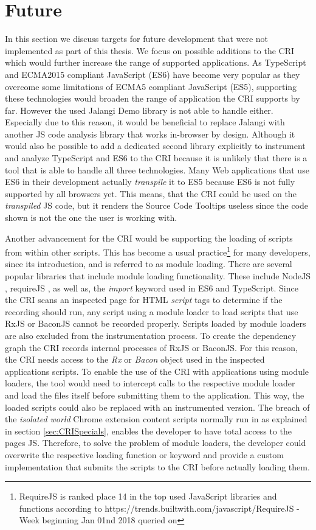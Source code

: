 \section{Future}
In this section we discuss targets for future development that were not implemented as part of this thesis. We focus on possible additions to the CRI which would further increase the range of supported applications. As TypeScript and ECMA2015 compliant JavaScript (ES6) have become very popular as they overcome some limitations of ECMA5 compliant JavaScript (ES5), supporting these technologies would broaden the range of application the CRI supports by far. However the used Jalangi Demo library is not able to handle either. Especially due to this reason, it would be beneficial to replace Jalangi with another JS code analysis library that works in-browser by design. Although it would also be possible to add a dedicated second library explicitly to instrument and analyze TypeScript and ES6 to the CRI because it is unlikely that there is a tool that is able to handle all three technologies. Many Web applications that use ES6 in their development actually \emph{transpile} it to ES5 because ES6 is not fully supported by all browsers yet. This means, that the CRI could be used on the \emph{transpiled} JS code, but it renders the Source Code Tooltips useless since the code shown is not the one the user is working with.

Another advancement for the CRI would be supporting the loading of scripts from within other scripts. This has become a usual practice\footnote{RequireJS is ranked place 14 in the top used JavaScript libraries and functions according to https://trends.builtwith.com/javascript/RequireJS - Week beginning Jan 01nd 2018 queried on \date{2018-01-03}} for many developers, since its introduction, and is referred to as module loading. There are several popular libraries that include module loading functionality. These include NodeJS \cite{NodeJS}, requireJS \cite{RequireJS}, as well as, the \emph{import} keyword used in ES6 and TypeScript. Since the CRI scans an inspected page for HTML \emph{script} tags to determine if the recording should run, any script using a module loader to load scripts that use RxJS or BaconJS cannot be recorded properly. Scripts loaded by module loaders are also excluded from the instrumentation process. To create the dependency graph the CRI records internal processes of RxJS or BaconJS. For this reason, the CRI needs access to the \emph{Rx} or \emph{Bacon} object used in the inspected applications scripts. To enable the use of the CRI with applications using module loaders, the tool would need to intercept calls to the respective module loader and load the files itself before submitting them to the application. This way, the loaded scripts could also be replaced with an instrumented version. The breach of the \emph{isolated world} Chrome extension content scripts normally run in as explained in section \ref{sec:CRISpecials}, enables the developer to have total access to the pages JS. Therefore, to solve the problem of module loaders, the developer could overwrite the respective loading function or keyword and provide a custom implementation that submits the scripts to the CRI before actually loading them.
	
